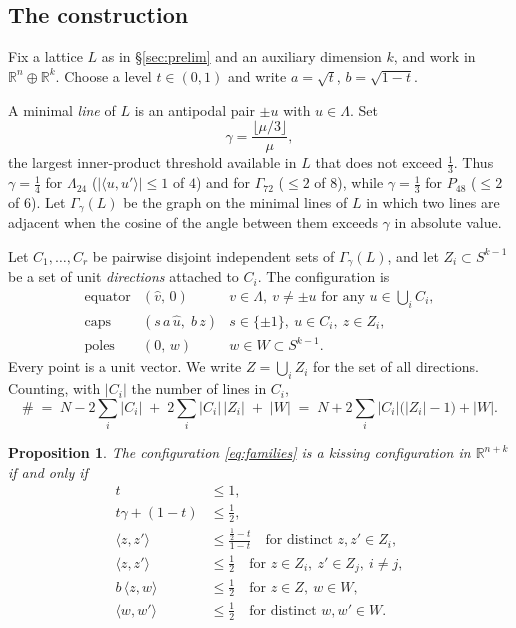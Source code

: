 \documentclass[11pt]{amsart}
\newtheorem{proposition}[theorem]{Proposition}
\theoremstyle{remark}
\newcommand{\Leech}{\Lambda_{24}}
\newcommand{\Pff}{P_{48}}
\newcommand{\Gsz}{\Gamma_{72}}
\newcommand{\ip}[2]{\langle #1,#2\rangle}
\newcommand{\R}{\mathbb{R}}
\begin{document}
\subsection{The construction}

Fix a lattice $L$ as in \S\ref{sec:prelim} and an auxiliary dimension $k$, and
work in $\R^{n}\oplus\R^{k}$. Choose a level $t\in(0,1)$ and write
$a=\sqrt t$, $b=\sqrt{1-t}$.

A minimal \emph{line} of $L$ is an antipodal pair $\pm u$ with $u\in\Lambda$. Set
\begin{equation}\label{eq:gamma}
  \gamma=\frac{\lfloor \mu/3\rfloor}{\mu},
\end{equation}
the largest inner-product threshold available in $L$ that does not exceed
$\tfrac13$. Thus $\gamma=\tfrac14$ for $\Leech$ ($|\ip{u}{u'}|\le1$ of $4$) and
for $\Gsz$ ($\le2$ of $8$), while $\gamma=\tfrac13$ for $\Pff$ ($\le2$ of $6$).
Let $\Gamma_\gamma(L)$ be the graph on the minimal lines of $L$ in which two
lines are adjacent when the cosine of the angle between them exceeds $\gamma$ in
absolute value.

Let $C_1,\dots,C_r$ be pairwise disjoint independent sets of $\Gamma_\gamma(L)$,
and let $Z_i\subset S^{k-1}$ be a set of unit \emph{directions} attached to
$C_i$. The configuration is
\begin{equation}\label{eq:families}
\begin{array}{lll}
  \text{equator} & (\hat v,\,0) & v\in\Lambda,\ v\ne\pm u \text{ for any } u\in\textstyle\bigcup_i C_i,\\[2pt]
  \text{caps}    & (s\,a\,\hat u,\; b\,z) & s\in\{\pm1\},\ u\in C_i,\ z\in Z_i,\\[2pt]
  \text{poles}   & (0,\,w) & w\in W\subset S^{k-1}.
\end{array}
\end{equation}
Every point is a unit vector. We write $Z=\bigcup_i Z_i$ for the set of all
directions. Counting,
with $|C_i|$ the number of lines in $C_i$,
\begin{equation}\label{eq:count}
  \#\;=\;N-2\sum_i|C_i|\;+\;2\sum_i|C_i|\,|Z_i|\;+\;|W|
  \;=\;N+2\sum_i|C_i|\bigl(|Z_i|-1\bigr)+|W| .
\end{equation}

\begin{proposition}\label{prop:cap}
The configuration \eqref{eq:families} is a kissing configuration in
$\R^{n+k}$ if and only if
\begin{align}
  t &\le 1, \label{eq:c2}\\
  t\gamma+(1-t) &\le \tfrac12, \label{eq:c3}\\
  \ip{z}{z'} &\le \frac{\tfrac12-t}{1-t}
     \quad\text{for distinct } z,z'\in Z_i, \label{eq:c4}\\
  \ip{z}{z'} &\le \tfrac12
     \quad\text{for } z\in Z_i,\ z'\in Z_j,\ i\ne j, \label{eq:c5}\\
  b\,\ip{z}{w} &\le \tfrac12
     \quad\text{for } z\in Z,\ w\in W, \label{eq:c6}\\
  \ip{w}{w'} &\le \tfrac12
     \quad\text{for distinct } w,w'\in W. \label{eq:c7}
\end{align}
\end{proposition}
\end{document}
